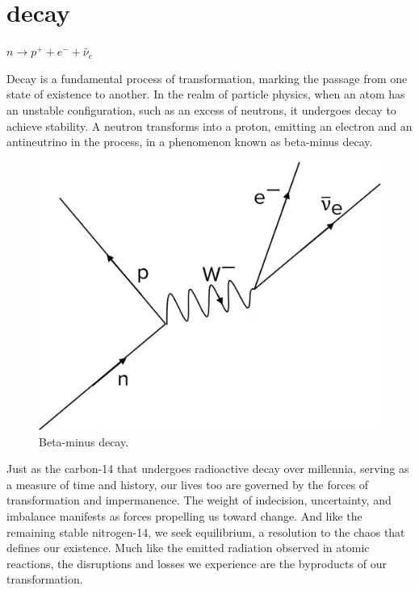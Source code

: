 \chapter*{decay}
\begin{center}
\vspace{2cm}
\begin{flushright}
\large
\textit{ $n \rightarrow p^+ + e^- + \bar{\nu}_e$ }
\end{flushright}
\vspace{2cm}
\end{center}
\normalsize

\newpage  
Decay is a fundamental process of transformation, marking the passage from one state of existence to another. In the realm of particle physics, when an atom has an unstable configuration, such as an excess of neutrons, it undergoes decay to achieve stability. A neutron transforms into a proton, emitting an electron and an antineutrino in the process, in a phenomenon known as beta-minus decay.

\begin{figure}
    \centering
    \includegraphics[width=0.8\linewidth]{assets/betaminusdecay.png} 
    \caption{\small Beta-minus decay.}
    \label{fig:betaminusdecay}
\end{figure}

Just as the carbon-14 that undergoes radioactive decay over millennia, serving as a measure of time and history, our lives too are governed by the forces of transformation and impermanence. The weight of indecision, uncertainty, and imbalance manifests as forces propelling us toward change. And like the remaining stable nitrogen-14, we seek equilibrium, a resolution to the chaos that defines our existence. Much like the emitted radiation observed in atomic reactions, the disruptions and losses we experience are the byproducts of our transformation.

